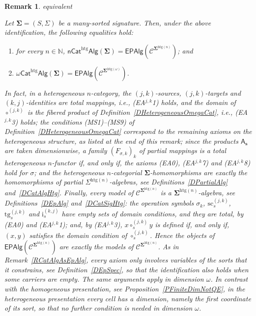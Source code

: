 \documentclass[a4paper, reqno]{amsbook}
\makeatletter
\newcommand{\sig}[1]{\mathbf{#1}}             %
\newcommand{\spec}[1]{\boldsymbol{\mathcal{#1}}} %
\newcommand{\htg}{\mathrm{htg}}                %
\newcommand{\src}{\mathrm{sc}}
\newcommand{\tgt}{\mathrm{tg}}
\theoremstyle{plain}
\newtheorem{remark}[theorem]{Remark}
\theoremstyle{definition}
\newcommand*{\CA@leanpending}{}
\newcommand*{\CA@leanrelation}{}
\newcommand*{\lean}[2]{%
  \ifcsname\string\color@lean@#1\endcsname\else
    \PackageError{main}{Unknown relation `#1' in \string\lean}{Use equivalent, weaker or stronger.}%
  \fi
  \gdef\CA@leanrelation{#1}%
  \gdef\CA@leanpending{#2}}
\makeatother
\begin{document}
\begin{remark}\label{RCatAlgAsEpAlgHtg}\lean{equivalent}{Heterogeneous.nModelIsomorphism,Heterogeneous.omegaModelIsomorphism}
Let $\sig{\Sigma}=(S,\Sigma)$ be a many-sorted signature.
Then, under the above identification, the following equalities hold:
\begin{enumerate}
	\item
	for every $n \in \mathbb{N}$, $\mathsf{nCat}^{\htg}\mathsf{Alg}(\sig{\Sigma})=\mathsf{EPAlg}(\spec{C}^{\sig{\Sigma}^{\htg(n)}})$; and

	\item
	$\omega\mathsf{Cat}^{\htg}\mathsf{Alg}(\sig{\Sigma})=\mathsf{EPAlg}(\spec{C}^{\sig{\Sigma}^{\htg(\omega)}})$.
\end{enumerate}
In fact, in a heterogeneous $n$-category, the $(j,k)$-sources, $(j,k)$-targets and $(k,j)$-identities are total mappings, i.e., (EA$^{j,k}$1) holds, and the domain of $\circ^{(j,k)}$ is the fibered product of Definition~\ref{DHeterogeneousOmegaCat}, i.e., (EA$^{j,k}$3) holds; the conditions (MS1)--(MS9) of Definition~\ref{DHeterogeneousOmegaCat} correspond to the remaining axioms on the heterogeneous structure, as listed at the end of this remark; since the products $\mathsf{A}_{\mathbf{s}}$ are taken dimensionwise, a family $(F_{\sigma,k})_{k}$ of partial mappings is a total heterogeneous $n$-functor if, and only if, the axioms (EA0), (EA$^{j,k}$7) and (EA$^{j,k}$8) hold for $\sigma$; and the heterogeneous $n$-categorial $\sig{\Sigma}$-homomorphisms are exactly the homomorphisms of partial $\Sigma^{\htg(n)}$-algebras, see Definitions~\ref{DPartialAlg} and~\ref{DCatAlgHtg}.
Finally, every model of $\spec{C}^{\sig{\Sigma}^{\htg(n)}}$ is a $\sig{\Sigma}^{\htg(n)}$-algebra, see Definitions~\ref{DEpAlg} and~\ref{DCatSigHtg}: the operation symbols $\sigma_{k}$, $\src^{(j,k)}_{s}$, $\tgt^{(j,k)}_{s}$ and $\mathrm{i}^{(k,j)}_{s}$ have empty sets of domain conditions, and they are total, by (EA0) and (EA$^{j,k}$1); and, by (EA$^{j,k}$3), $x\circ^{(j,k)}_{s}y$ is defined if, and only if, $(x,y)$ satisfies the domain condition of $\circ^{(j,k)}_{s}$.
Hence the objects of $\mathsf{EPAlg}(\spec{C}^{\sig{\Sigma}^{\htg(n)}})$ are exactly the models of $\spec{C}^{\sig{\Sigma}^{\htg(n)}}$.
As in Remark~\ref{RCatAlgAsEpAlg}, every axiom only involves variables of the sorts that it constrains, see Definition~\ref{DEpSpec}, so that the identification also holds when some carriers are empty.
The same arguments apply in dimension $\omega$.
In contrast with the homogeneous presentation, see Proposition~\ref{PFiniteDimNotQE}, in the heterogeneous presentation every cell has a dimension, namely the first coordinate of its sort, so that no further condition is needed in dimension $\omega$.

\end{remark}
\end{document}
